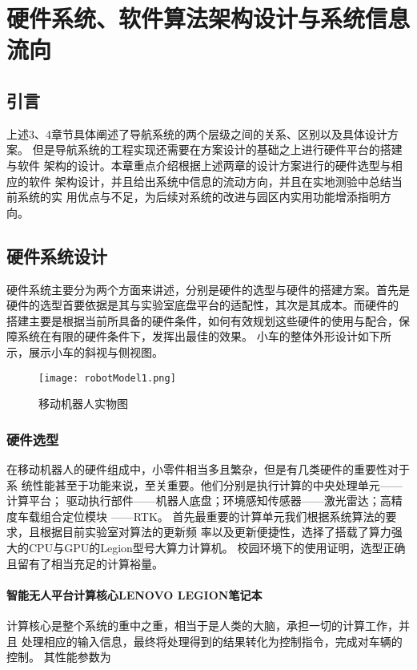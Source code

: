 \chapter{硬件系统、软件算法架构设计与系统信息流向}
\section{引言}
上述3、4章节具体阐述了导航系统的两个层级之间的关系、区别以及具体设计方案。
但是导航系统的工程实现还需要在方案设计的基础之上进行硬件平台的搭建与软件
架构的设计。本章重点介绍根据上述两章的设计方案进行的硬件选型与相应的软件
架构设计，并且给出系统中信息的流动方向，并且在实地测验中总结当前系统的实
用优点与不足，为后续对系统的改进与园区内实用功能增添指明方向。

\section{硬件系统设计}
硬件系统主要分为两个方面来讲述，分别是硬件的选型与硬件的搭建方案。首先是
硬件的选型首要依据是其与实验室底盘平台的适配性，其次是其成本。而硬件的
搭建主要是根据当前所具备的硬件条件，如何有效规划这些硬件的使用与配合，保
障系统在有限的硬件条件下，发挥出最佳的效果。
小车的整体外形设计如下所示，展示小车的斜视与侧视图。
\begin{figure}[ht]
    \centering
    \texttt{[image: robotModel1.png]}
    \caption{移动机器人实物图}
\end{figure}

\subsection{硬件选型}
在移动机器人的硬件组成中，小零件相当多且繁杂，但是有几类硬件的重要性对于系
统性能甚至于功能来说，至关重要。他们分别是执行计算的中央处理单元——计算平台；
驱动执行部件——机器人底盘；环境感知传感器——激光雷达；高精度车载组合定位模块
——RTK。
首先最重要的计算单元我们根据系统算法的要求，且根据目前实验室对算法的更新频
率以及更新便捷性，选择了搭载了算力强大的CPU与GPU的Legion型号大算力计算机。
校园环境下的使用证明，选型正确且留有了相当充足的计算裕量。

\subsubsection{智能无人平台计算核心LENOVO LEGION笔记本}
计算核心是整个系统的重中之重，相当于是人类的大脑，承担一切的计算工作，并且
处理相应的输入信息，最终将处理得到的结果转化为控制指令，完成对车辆的控制。
其性能参数为

